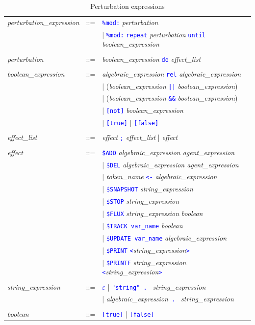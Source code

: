 \documentclass[11pt]{book}
\def\tcb#1{\textcolor{blue}{\ttt{#1}}}
\def\ttt#1{\texttt{#1}}
\def\var#1{{\textquotesingle}#1{\textquotesingle}}
\begin{document}
\begin{table}[htbp]
  \centering
  \caption{Perturbation expressions}
  \begin{tabular}{@{} lcl @{}}
  	\textit{perturbation\_expression} &::=& \tcb{\ttt{\%mod:}} \textit{perturbation} \\
	&& | \tcb{\ttt{\%mod:}} \tcb{\ttt{repeat}} \textit{perturbation} \tcb{\ttt{until}} \textit{boolean\_expression} \\\\ 
    
    \textit{perturbation} &::=& \textit{boolean\_expression} \tcb{\ttt{do}} \textit{effect\_list} \\\\
    \textit{boolean\_expression} &::=& \textit{algebraic\_expression}\index{boolean expression} \tcb{rel} \textit{algebraic\_expression} \\
    && | (\textit{boolean\_expression} \tcb{||} \textit{boolean\_expression}) \\
    && | (\textit{boolean\_expression} \tcb{\&\&} \textit{boolean\_expression}) \\
    && | \tcb{[not]} \textit{boolean\_expression} \\
    && | \tcb{[true]} | \tcb{[false]} \\\\
    \textit{effect\_list} &::=& \textit{effect} \tcb{\ttt {;}} \textit{effect\_list} | \textit{effect} \\\\
\textit{effect} &::=& \tcb{\$ADD} \textit{algebraic\_expression agent\_expression} \\
    && | \tcb{\$DEL} \textit{algebraic\_expression agent\_expression} \\
    && | \textit{token\_name} \tcb{<-} \textit{algebraic\_expression} \\
    && | \tcb{\$SNAPSHOT} \textit{string\_expression}\\
    && | \tcb{\$STOP} \textit{string\_expression}\\
	&& | \tcb{\$FLUX} \textit{string\_expression} \textit{boolean} \\
    && | \tcb{\$TRACK \var{var\_name}} \textit{boolean} \\
    && | \tcb{\$UPDATE \var{var\_name}} \textit{algebraic\_expression} \\
    && | \tcb{\$PRINT} \tcb{<}\textit{string\_expression}\tcb{>} \\
    && | \tcb{\$PRINTF} \textit{string\_expression} \tcb{<}\textit{string\_expression}\tcb{>} \\
    \\
    \textit{string\_expression} &::=& \tcb{$\varepsilon$} | \tcb{"string" . } \textit{string\_expression} \\
    && | \textit{algebraic\_expression}\tcb{ . } \textit{string\_expression} \\\\
	\textit{boolean} &::=& \tcb{[true]} | \tcb{[false]}
  \end{tabular}
  \label{tab:pert}
\end{table}
\end{document}
